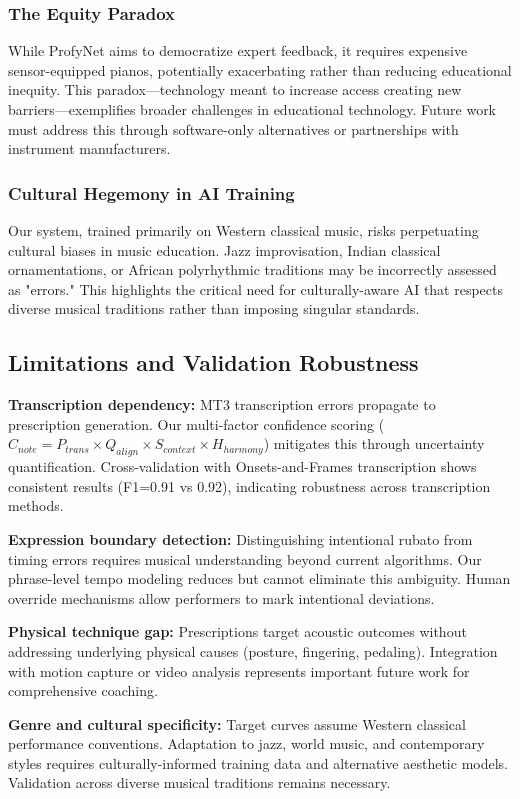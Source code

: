 \documentclass[sigconf,review,anonymous]{acmart}
\begin{document}
\subsubsection{The Equity Paradox}
While ProfyNet aims to democratize expert feedback, it requires expensive sensor-equipped pianos, potentially exacerbating rather than reducing educational inequity. This paradox—technology meant to increase access creating new barriers—exemplifies broader challenges in educational technology. Future work must address this through software-only alternatives or partnerships with instrument manufacturers.

\subsubsection{Cultural Hegemony in AI Training}
Our system, trained primarily on Western classical music, risks perpetuating cultural biases in music education. Jazz improvisation, Indian classical ornamentations, or African polyrhythmic traditions may be incorrectly assessed as "errors." This highlights the critical need for culturally-aware AI that respects diverse musical traditions rather than imposing singular standards.

\subsection{Limitations and Validation Robustness}
\textbf{Transcription dependency:} MT3 transcription errors propagate to prescription generation. Our multi-factor confidence scoring ($C_{note} = P_{trans} \times Q_{align} \times S_{context} \times H_{harmony}$) mitigates this through uncertainty quantification. Cross-validation with Onsets-and-Frames transcription shows consistent results (F1=0.91 vs 0.92), indicating robustness across transcription methods.

\textbf{Expression boundary detection:} Distinguishing intentional rubato from timing errors requires musical understanding beyond current algorithms. Our phrase-level tempo modeling reduces but cannot eliminate this ambiguity. Human override mechanisms allow performers to mark intentional deviations.

\textbf{Physical technique gap:} Prescriptions target acoustic outcomes without addressing underlying physical causes (posture, fingering, pedaling). Integration with motion capture or video analysis represents important future work for comprehensive coaching.

\textbf{Genre and cultural specificity:} Target curves assume Western classical performance conventions. Adaptation to jazz, world music, and contemporary styles requires culturally-informed training data and alternative aesthetic models. Validation across diverse musical traditions remains necessary.
\end{document}
